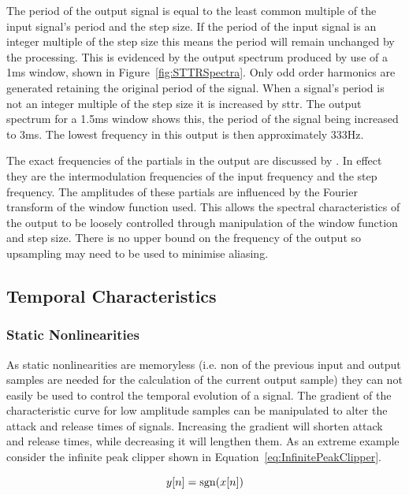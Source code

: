 			The period of the output signal is equal to the least common multiple of the input signal's period
			and the step size. If the period of the input signal is an integer multiple of the step size this
			means the period will remain unchanged by the processing. This is evidenced by the output spectrum
			produced by use of a 1ms window, shown in Figure~\ref{fig:STTRSpectra}. Only odd order harmonics
			are generated retaining the original period of the signal. When a signal's period is not an integer
			multiple of the step size it is increased by \acrshort{sttr}. The output spectrum for a 1.5ms
			window shows this, the period of the signal being increased to 3ms. The lowest frequency in this
			output is then approximately 333Hz.

			The exact frequencies of the partials in the output are discussed by \citet{kim2014shorttime}. In
			effect they are the intermodulation frequencies of the input frequency and the step frequency. The
			amplitudes of these partials are influenced by the Fourier transform of the window function used.
			This allows the spectral characteristics of the output to be loosely controlled through
			manipulation of the window function and step size. There is no upper bound on the frequency of the
			output so upsampling may need to be used to minimise aliasing.

	\subsection{Temporal Characteristics}
	\label{sec:ExcitationEvaluation-Comparison-TemporalCharacteristics}
		\subsubsection*{Static Nonlinearities}
			As static nonlinearities are memoryless (i.e. non of the previous input and output samples are
			needed for the calculation of the current output sample) they can not easily be used to control the
			temporal evolution of a signal. The gradient of the characteristic curve for low amplitude samples
			can be manipulated to alter the attack and release times of signals. Increasing the gradient will
			shorten attack and release times, while decreasing it will lengthen them. As an extreme example
			consider the infinite peak clipper shown in Equation~\ref{eq:InfinitePeakClipper}.

			\begin{equation}
				y[n] = \operatorname{sgn}(x[n])
				\label{eq:InfinitePeakClipper}
			\end{equation}
			

